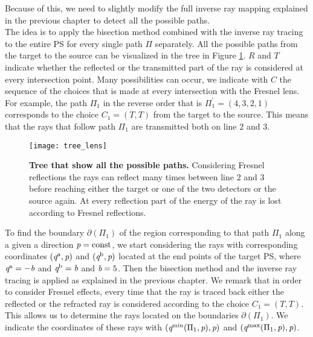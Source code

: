 Because of this, we need to slightly modify the full inverse ray mapping explained in the previous chapter to detect all the possible paths. \\ \indent
The idea is to apply the bisection method combined with the inverse ray tracing to the entire PS for every single path $\Pi$ separately. All the possible paths from the target to the source can be visualized in the tree in Figure \ref{fig:tree_fresnel}. $R$ and $T$ indicate whether the reflected or the transmitted part of the ray is considered at every intersection point. Many possibilities can occur, we indicate with $C$ the sequence of the choices that is made at every intersection with the Fresnel lens. For example, the path $\Pi_1$ in the reverse order that is 
$\Pi_1^{\prime}=(4,3,2,1)$ corresponds to the choice $C_1= (T,T)$ from the target to the source. This means that the rays that follow path $\Pi_1$ are transmitted both on line $2$ and $3$. 
\begin{figure}[t]
  \begin{center}
  \texttt{[image: tree\_lens]}
  \end{center}
  \caption{\textbf{Tree that show all the possible paths.} Considering Fresnel reflections the rays can reflect many times between line $2$ and $3$ before reaching either the target or one of the two detectors or the source again. At every reflection part of the energy of the ray is lost according to Fresnel reflections.}
\label{fig:tree_fresnel}
 \end{figure}
To find the boundary $\partial$$(\Pi_1)$ of the region corresponding to that path $\Pi_1$ along a given a direction $\textit{p} = \textrm{const}$, we start considering the rays with corresponding coordinates $(\textit{q}^{\textrm{a}}, \textit{p})$ and $(\textit{q}^{\textrm{b}}, \textit{p})$ located at the end points of the target PS, where $\textit{q}^{\textrm{a}} = -\textit{b}$ and $\textit{q}^{\textrm{b}} = \textit{b}$ and $\textit{b}=5$. Then the bisection method and the inverse ray tracing is applied as explained in the previous chapter. We remark that in order to consider Fresnel effects, every time that the ray is traced back either the reflected or the refracted ray is considered according to the choice $C_1= (T,T)$. This allows us to determine the rays located on the boundaries $\partial$$(\Pi_1)$. We indicate the coordinates of these rays with $(\textit{q}^{\textrm{min}}(\Pi_1, \textit{p}), \textit{p})$ and $(\textit{q}^{\textrm{max}}(\Pi_1, \textit{p}), \textit{p})$. \\ \indent
